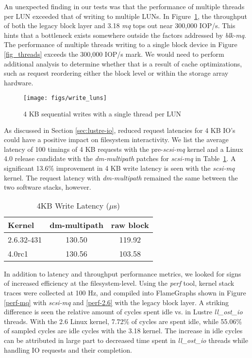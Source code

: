 \documentclass[conference]{IEEEtran}
\begin{document}
An unexpected finding in our tests was that the performance of multiple threads per LUN exceeded that of writing to multiple LUNs. In Figure~\ref{fig_luns},
the throughput of both the legacy block layer and 3.18 \emph{mq} tops out near 300,000 IOP/s. This hints that a bottleneck
exists somewhere outside the factors addressed by \emph{blk-mq}. The performance of multiple threads writing to a single block
device in Figure \ref{fig_threads} exceeds the 300,000 IOP/s mark.  We would need to perform additional analysis to determine
whether that is a result of cache optimizations, such as request reordering either the block level or within
the storage array hardware.


\begin{figure}[!t]
\centering
\texttt{[image: figs/write\_luns]}
\caption{4 KB sequential writes with a single thread per LUN}
\label{fig_luns}
\end{figure}


As discussed in Section \ref{sec:lustre-io}, reduced request latencies for 4 KB IO's could have a positive impact on filesystem
interactivity. We list the average latency of 100 timings of 4 KB requests with the pre-\emph{scsi-mq} kernel and a Linux 4.0 release candidate
with the \emph{dm-multipath} patches for \emph{scsi-mq} in Table~\ref{tab:latency}. A significant 13.6\% improvement in 4 KB write latency is seen
with the \emph{scsi-mq} kernel.  The request latency with \emph{dm-multipath} remained the same between the two software stacks, however.

\begin{table}[!h]
\caption{4KB Write Latency ($\mu$s)}
\centering
\begin{tabular}{l c c}
\hline\hline
{\bf Kernel} & {\bf dm-multipath} & {\bf raw block} \\
\hline
   2.6.32-431 &   130.50  &   119.92 \\
   4.0rc1 &   130.56  &   103.58 \\
\hline\hline
\end{tabular}
\label{tab:latency}
\end{table}


In addition to latency and throughput performance metrics, we looked for signs of increased efficiency at the filesystem-level. Using the
\emph{perf} tool, kernel stack traces were collected at 100 Hz, and compiled into FlameGraphs \cite{flamegraphs} shown in Figure \ref{perf-mq} 
with \emph{scsi-mq} and \ref{perf-2.6} with the legacy block layer.  A striking difference is seen the relative amount of cycles spent idle vs.
in Lustre \emph{ll\_ost\_io} threads. With the 2.6 Linux kernel, 7.72\% of cycles are spent idle, while 55.06\%
of sampled cycles are idle cycles with the 3.18 kernel. The increase in idle cycles can be attributed in large part to decreased time spent in \emph{ll\_ost\_io}
threads while handling IO requests and their completion.
\end{document}
